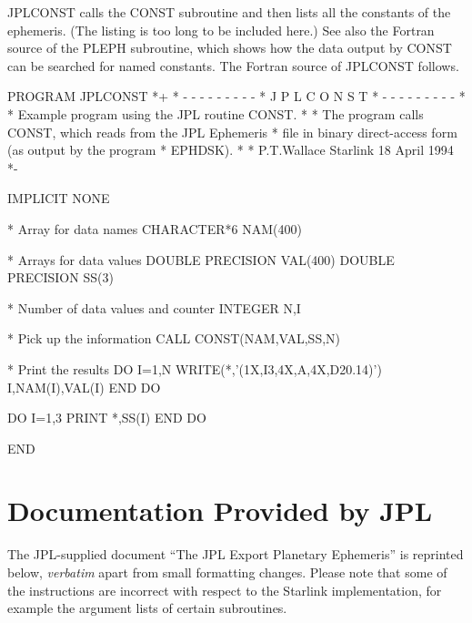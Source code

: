 \documentclass[twoside,11pt,nolof]{starlink}
\begin{document}
JPLCONST calls the CONST subroutine and then
lists all the constants of the ephemeris.  (The listing is too long
to be included here.)
See also the Fortran source of the PLEPH subroutine, which shows
how the data output by CONST can be searched for named constants.
The Fortran source of JPLCONST follows.

\begin{small}
\begin{terminalv}
      PROGRAM JPLCONST
*+
*  - - - - - - - - -
*   J P L C O N S T
*  - - - - - - - - -
*
*  Example program using the JPL routine CONST.
*
*  The program calls CONST, which reads from the JPL Ephemeris
*  file in binary direct-access form (as output by the program
*  EPHDSK).
*
*  P.T.Wallace   Starlink   18 April 1994
*-

      IMPLICIT NONE

*  Array for data names
      CHARACTER*6 NAM(400)

*  Arrays for data values
      DOUBLE PRECISION VAL(400)
      DOUBLE PRECISION SS(3)

*  Number of data values and counter
      INTEGER N,I

*  Pick up the information
      CALL CONST(NAM,VAL,SS,N)

* Print the results
      DO I=1,N
         WRITE(*,'(1X,I3,4X,A,4X,D20.14)')  I,NAM(I),VAL(I)
      END DO

      DO I=1,3
         PRINT *,SS(I)
      END DO

      END
\end{terminalv}
\end{small}

\newpage

\section{Documentation Provided by JPL}
\label{documentation_provided_by_jpl}

The JPL-supplied document ``The JPL Export Planetary Ephemeris'' is
reprinted below, \textit{verbatim}\/ apart from small formatting changes.
Please note that some of the instructions are incorrect with respect to
the Starlink implementation, for example the argument lists of certain
subroutines.

\end{document}
